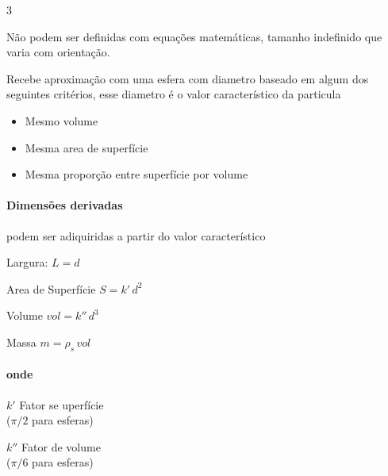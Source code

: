 \documentclass[\mainfilename]{subfiles}
\begin{document}
\begin{sectionBox}
\begin{sectionBox}
    \end{sectionBox}
    
    \begin{sectionBox}3{} %
        
        Não podem ser definidas com equações matemáticas,
        tamanho indefinido que varia com orientação.
        
        Recebe aproximação com uma esfera com diametro baseado em algum dos seguintes critérios, esse diametro é o valor característico da particula
        \begin{itemize}
            \item Mesmo volume
            \item Mesma area de superfície
            \item Mesma proporção entre superfície por volume
        \end{itemize}

        \paragraph*{Dimensões derivadas} podem ser adiquiridas a partir do valor característico
        \begin{itemize}
            \begin{multicols}{2}
                \item Largura: \(L=d\)
                \item Area de Superfície \(S = k'\,d^2\)
                \item Volume \(vol = k''\,d^3\)
                \item Massa \(m = \rho_s\,vol\)
            \end{multicols}
        \end{itemize}

        \paragraph*{onde}
        \begin{itemize}
            \begin{multicols}{2}
                \item \(k'\) Fator se uperfície\\(\(\pi/2\) para esferas)
                \item \(k''\) Fator de volume\\(\(\pi/6\) para esferas)
            \end{multicols}
        \end{itemize}
        
    \end{sectionBox}

\end{sectionBox}
\end{document}
